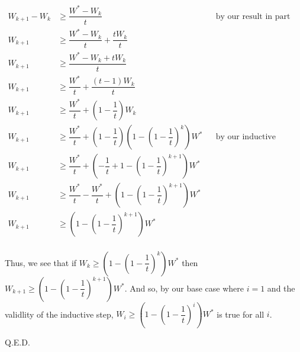 \documentclass{article}
\begin{document}
\begin{align*}
    W_{k+1} - W_{k} &\geq \dfrac{W^* - W_k}{t} && \text{by our result in part b)} \\
            W_{k+1} &\geq \dfrac{W^* - W_k}{t} + \dfrac{t W_k}{t} \\
            W_{k+1} &\geq \dfrac{W^* - W_k + tW_k}{t} \\
            W_{k+1} &\geq \dfrac{W^*}{t} + \dfrac{(t-1)W_k}{t} \\
            W_{k+1} &\geq \dfrac{W^*}{t} + (1 - \dfrac{1}{t})W_k \\
            W_{k+1} &\geq \dfrac{W^*}{t} + (1 - \dfrac{1}{t})(1 - (1 - \dfrac{1}{t})^k)W^* && \text{by our inductive
            hypothesis} \\
            W_{k+1} &\geq \dfrac{W^*}{t} + (-\dfrac{1}{t} + 1 - (1 - \dfrac{1}{t})^{k+1})W^* \\
            W_{k+1} &\geq \dfrac{W^*}{t} - \dfrac{W^*}{t} + (1 - (1 - \dfrac{1}{t})^{k+1})W^* \\
            W_{k+1} &\geq (1 - (1 - \dfrac{1}{t})^{k+1})W^* \\
\end{align*}

Thus, we see that if $W_k \geq (1 - (1 - \dfrac{1}{t})^k) W^*$ then $W_{k+1} \geq (1 - (1 - \dfrac{1}{t})^{k+1}) W^*$.
And so, by our base case where $i=1$ and the validlity of the inductive step, $W_i \geq (1 - (1 - \dfrac{1}{t})^i) W^*$
is true for all $i$.

\hspace*{\fill} Q.E.D.
\end{document}
